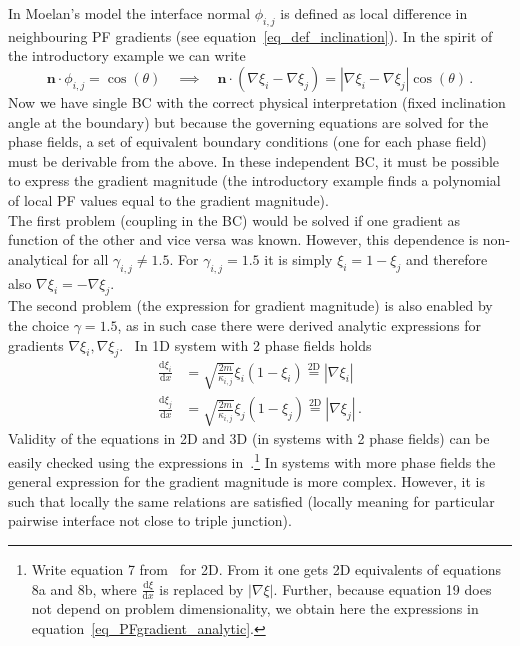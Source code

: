 In Moelan's model the interface normal $\phi_{i,j}$ is defined as local difference in neighbouring PF gradients (see equation~\ref{eq_def_inclination}). In the spirit of the introductory example we can write
\begin{equation}
	\bm{n}\cdot\phi_{i,j} = \cos(\theta) \quad \implies \quad \bm{n}\cdot(\nabla\xi_i-\nabla\xi_j) = |\nabla\xi_i-\nabla\xi_j|\cos(\theta) \,.
\end{equation}
Now we have single BC with the correct physical interpretation (fixed inclination angle at the boundary) but because the governing equations are solved for the phase fields, a set of equivalent boundary conditions (one for each phase field) must be derivable from the above. In these independent BC, it must be possible to express the gradient magnitude (the introductory example finds a polynomial of local PF values equal to the gradient magnitude). \\
The first problem (coupling in the BC) would be solved if one gradient as function of the other and vice versa was known. However, this dependence is non-analytical for all $\gamma_{i,j}\neq1.5$. For $\gamma_{i,j}=1.5$ it is simply $\xi_i = 1-\xi_j$ and therefore also $\nabla\xi_i=-\nabla\xi_j$.~\cite{Moelans2008_PRB} \\
The second problem (the expression for gradient magnitude) is also enabled by the choice $\gamma=1.5$, as in such case there were derived analytic expressions for gradients $\nabla\xi_i,\nabla\xi_j$.~\cite{Moelans2008_PRB} In 1D system with 2 phase fields holds
\begin{equation} \label{eq_PFgradient_analytic}
	\begin{split}
		\frac{\mathrm{d}\xi_i}{\mathrm{d}x} &= \sqrt{\frac{2m}{\kappa_{i,j}}}\xi_i(1-\xi_i) \overset{\mathrm{2D}}{=} |\nabla\xi_i| \\
		\frac{\mathrm{d}\xi_j}{\mathrm{d}x} &= \sqrt{\frac{2m}{\kappa_{i,j}}}\xi_j(1-\xi_j) \overset{\mathrm{2D}}{=} |\nabla\xi_j| \,.
	\end{split}
\end{equation}
Validity of the equations in 2D and 3D (in systems with 2 phase fields) can be easily checked using the expressions in~\cite{Moelans2008_PRB}.\footnote{Write equation 7 from~\cite{Moelans2008_PRB} for 2D. From it one gets 2D equivalents of equations 8a and 8b, where $\frac{\mathrm{d}\xi}{\mathrm{d}x}$ is replaced by $|\nabla\xi|$. Further, because equation 19 does not depend on problem dimensionality, we obtain here the expressions in equation~\ref{eq_PFgradient_analytic}.} In systems with more phase fields the general expression for the gradient magnitude is more complex. However, it is such that locally the same relations are satisfied (locally meaning for particular pairwise interface not close to triple junction).\\
